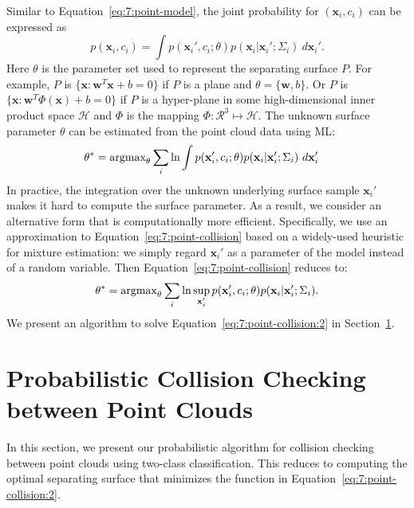 Similar to Equation~\ref{eq:7:point-model}, the joint probability for $(\mathbf x_i, c_i)$ can be expressed as
\begin{equation}
p(\mathbf x_i, c_i) = \int p(\mathbf x_i', c_i; \theta) p(\mathbf x_i|\mathbf x_i'; \Sigma_i) \ d\mathbf x_i'.
\end{equation}
Here $\theta$ is the parameter set used to represent the separating surface $P$. For example, $P$ is $\{\mathbf x: \mathbf w^T \mathbf x + b = 0\}$ if $P$ is a plane and $\theta = \{\mathbf w, b\}$. Or $P$ is $\{\mathbf x: \mathbf w^T \Phi(\mathbf x) + b = 0\}$ if $P$ is a hyper-plane in some high-dimensional inner product space $\mathcal H$ and $\Phi$ is the mapping $\Phi: \mathcal R^3 \mapsto \mathcal H$. The unknown surface parameter $\theta$ can be estimated from the point cloud data using ML:
\begin{equation}
\begin{aligned}
\label{eq:7:point-collision}
\theta^*
&= \operatorname{argmax}_{\theta} \sum_i \ln \int p(\mathbf x_i', c_i; \theta) p(\mathbf x_i|\mathbf x_i'; \Sigma_i) \ d\mathbf x_i'
\end{aligned}
\end{equation}
In practice, the integration over the unknown underlying surface sample $\mathbf x_i'$ makes it hard to compute the surface parameter. As a result,
we consider an alternative form that is computationally more efficient. Specifically, we use an approximation to Equation~\ref{eq:7:point-collision}
based on a widely-used heuristic for mixture estimation: we simply regard $\mathbf x_i'$ as a parameter of the model instead of a random variable. Then Equation~\ref{eq:7:point-collision} reduces to:
\begin{equation}
\label{eq:7:point-collision:2}
\theta^* = \operatorname{argmax}_{\theta} \sum_i \ln \sup_{\mathbf x_i'} p(\mathbf x_i', c_i; \theta) p(\mathbf x_i|\mathbf x_i'; \Sigma_i).
\end{equation}
We present an algorithm to solve Equation~\ref{eq:7:point-collision:2} in Section~\ref{sec:7:algorithm}.


\section{Probabilistic Collision Checking between Point Clouds}
\label{sec:7:algorithm}
In this section, we present our probabilistic algorithm for collision checking between point clouds using two-class classification. This reduces to computing the optimal separating surface that minimizes the function in Equation~\ref{eq:7:point-collision:2}.


